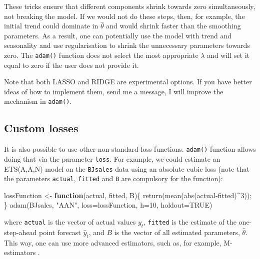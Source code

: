 \documentclass[
]{book}
\newenvironment{Shaded}{\begin{snugshade}}{\end{snugshade}}
\newcommand{\AttributeTok}[1]{\textcolor[rgb]{0.77,0.63,0.00}{#1}}
\newcommand{\ConstantTok}[1]{\textcolor[rgb]{0.00,0.00,0.00}{#1}}
\newcommand{\ControlFlowTok}[1]{\textcolor[rgb]{0.13,0.29,0.53}{\textbf{#1}}}
\newcommand{\DecValTok}[1]{\textcolor[rgb]{0.00,0.00,0.81}{#1}}
\newcommand{\FunctionTok}[1]{\textcolor[rgb]{0.00,0.00,0.00}{#1}}
\newcommand{\NormalTok}[1]{#1}
\newcommand{\OtherTok}[1]{\textcolor[rgb]{0.56,0.35,0.01}{#1}}
\newcommand{\SpecialCharTok}[1]{\textcolor[rgb]{0.00,0.00,0.00}{#1}}
\newcommand{\StringTok}[1]{\textcolor[rgb]{0.31,0.60,0.02}{#1}}
\theoremstyle{definition}
\theoremstyle{definition}
\theoremstyle{definition}
\theoremstyle{definition}
\theoremstyle{remark}
\begin{document}
These tricks ensure that different components shrink towards zero simultaneously, not breaking the model. If we would not do these steps, then, for example, the initial trend could dominate in \(\hat{\theta}\) and would shrink faster than the smoothing parameters. As a result, one can potentially use the model with trend and seasonality and use regularisation to shrink the unnecessary parameters towards zero. The \texttt{adam()} function does not select the most appropriate \(\lambda\) and will set it equal to zero if the user does not provide it.

Note that both LASSO and RIDGE are experimental options. If you have better ideas of how to implement them, send me a message, I will improve the mechanism in \texttt{adam()}.

\hypertarget{custom-losses}{%
\subsection{Custom losses}\label{custom-losses}}

It is also possible to use other non-standard loss functions. \texttt{adam()} function allows doing that via the parameter \texttt{loss}. For example, we could estimate an ETS(A,A,N) model on the \texttt{BJsales} data using an absolute cubic loss (note that the parameters \texttt{actual}, \texttt{fitted} and \texttt{B} are compulsory for the function):

\begin{Shaded}
\begin{Highlighting}[]
\NormalTok{lossFunction }\OtherTok{\textless{}{-}} \ControlFlowTok{function}\NormalTok{(actual, fitted, B)\{}
  \FunctionTok{return}\NormalTok{(}\FunctionTok{mean}\NormalTok{(}\FunctionTok{abs}\NormalTok{(actual}\SpecialCharTok{{-}}\NormalTok{fitted)}\SpecialCharTok{\^{}}\DecValTok{3}\NormalTok{));}
\NormalTok{\}}
\FunctionTok{adam}\NormalTok{(BJsales, }\StringTok{"AAN"}\NormalTok{, }\AttributeTok{loss=}\NormalTok{lossFunction, }\AttributeTok{h=}\DecValTok{10}\NormalTok{, }\AttributeTok{holdout=}\ConstantTok{TRUE}\NormalTok{)}
\end{Highlighting}
\end{Shaded}

where \texttt{actual} is the vector of actual values \(y_t\), \texttt{fitted} is the estimate of the one-step-ahead point forecast \(\hat{y}_t\), and \(B\) is the vector of all estimated parameters, \(\hat{\theta}\). This way, one can use more advanced estimators, such as, for example, M-estimators \citep{Barrow2020}.
\end{document}
